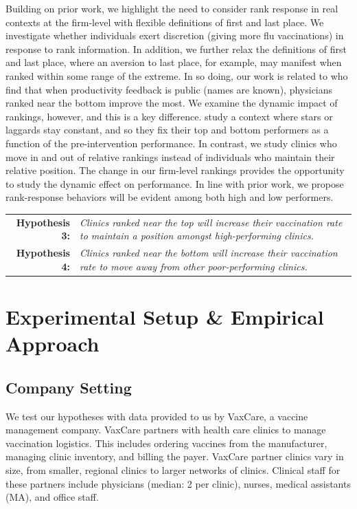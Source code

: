 \begin{onehalfspace}
 Building on prior work, we highlight the need to consider rank response in real contexts at the firm-level with flexible definitions of first and last place. We investigate whether individuals exert discretion (giving more flu vaccinations) in response to rank information. In addition, we further relax the definitions of first and last place, where an aversion to last place, for example, may manifest when ranked within some range of the extreme. In so doing, our work is related to \cite{Song2018a} who find that when productivity feedback is public (names are known), physicians ranked near the bottom improve the most. We examine the dynamic impact of rankings, however, and this is a key difference. \cite{Song2018a} study a context where stars or laggards stay constant, and so they fix their top and bottom performers as a function of the pre-intervention performance. In contrast, we study clinics who move in and out of relative rankings instead of individuals who maintain their relative position. The change in our firm-level rankings provides the opportunity to study the dynamic effect on performance. In line with prior work, we propose rank-response behaviors will be evident among both high and low performers. 

 \medskip \noindent
 \begin{tabularx} {\linewidth}{ r X }
    \textbf{Hypothesis 3:} & \textit{Clinics ranked near the top will increase their vaccination rate to maintain a position amongst high-performing clinics.} \\
    \textbf{Hypothesis 4:} & \textit{Clinics ranked near the bottom will increase their vaccination rate to move away from other poor-performing clinics.}
 \end{tabularx}   %
 
\section{Experimental Setup \& Empirical Approach} \label{empirics}
 \subsection{Company Setting}
 We test our hypotheses with data provided to us by VaxCare, a vaccine management company. VaxCare partners with health care clinics to manage vaccination logistics. This includes ordering vaccines from the manufacturer, managing clinic inventory, and billing the payer. VaxCare partner clinics vary in size, from smaller, regional clinics to larger networks of clinics. Clinical staff for these partners include physicians (median: 2 per clinic), nurses, medical assistants (MA), and office staff.
 

\end{onehalfspace}
